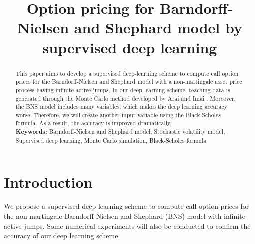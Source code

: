 
\title{Option pricing for Barndorff-Nielsen and Shephard model by supervised deep learning}
\maketitle

\begin{abstract}
This paper aims to develop a supervised deep-learning scheme to compute call option prices for the Barndorff-Nielsen and Shephard model
with a non-martingale asset price process having infinite active jumps.
In our deep learning scheme, teaching data is generated through the Monte Carlo method developed by Arai and Imai \cite{AI}.
Moreover, the BNS model includes many variables, which makes the deep learning accuracy worse.
Therefore, we will create another input variable using the Black-Scholes formula. As a result, the accuracy is improved dramatically. \\
{\bf Keywords:} Barndorff-Nielsen and Shephard model, Stochastic volatility model, Supervised deep learning, Monte Carlo simulation, Black-Scholes formula
\end{abstract}

\section{Introduction}\setcounter{equation}{0}
We propose a supervised deep learning scheme to compute call option prices for
the non-martingale Barndorff-Nielsen and Shephard (BNS) model with infinite active jumps.
Some numerical experiments will also be conducted to confirm the accuracy of our deep learning scheme.

